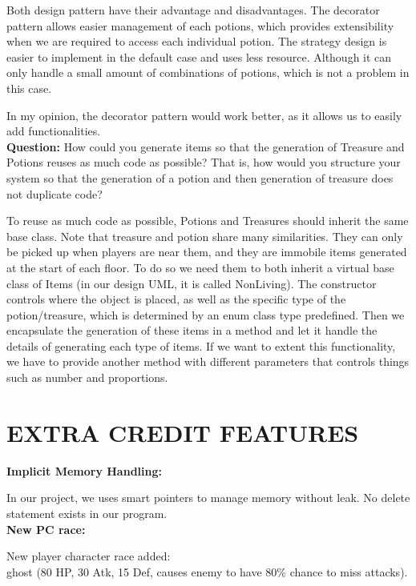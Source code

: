 \documentclass[11pt]{article}
\theoremstyle{plain} \newtheorem{theorem*}{Theorem}[subsection]
\begin{document}
Both design pattern have their advantage and disadvantages. The decorator
pattern allows easier management of each potions, which provides extensibility
when we are required to access each individual potion. The strategy design is
easier to implement in the default case and uses less resource. Although it can
only handle a small amount of combinations of potions, which is not a problem
in this case.  

In my opinion, the decorator pattern would work better, as it allows us to
easily add functionalities. \\

\textbf{Question:}
How could you generate items so that the generation of Treasure and Potions
reuses as much code as possible? That is, how would you structure your system
so that the generation of a potion and then generation of treasure does not
duplicate code? 

To reuse as much code as possible, Potions and Treasures should inherit the
same base class. Note that treasure and potion share many similarities. They
can only be picked up when players are near them, and they are immobile items
generated at the start of each floor. To do so we need them to both inherit a
virtual base class of Items (in our design UML, it is called NonLiving). The
constructor controls where the object is placed, as well as the specific type
of the potion/treasure, which is determined by an enum class type predefined.
Then we encapsulate the generation of these items in a method and let it handle
the details of generating each type of items. If we want to extent this
functionality, we have to provide another method with different parameters that
controls things such as number and proportions. 



\section{EXTRA CREDIT FEATURES}

\textbf{Implicit Memory Handling: }

In our project, we uses smart pointers to manage memory without leak. No delete 
statement exists in our program.  \\

\textbf{New PC race: }

New player character race added: \\
\indent ghost (80 HP, 30 Atk, 15 Def, causes enemy to 
have 80\% chance to miss attacks). 
\end{document}
